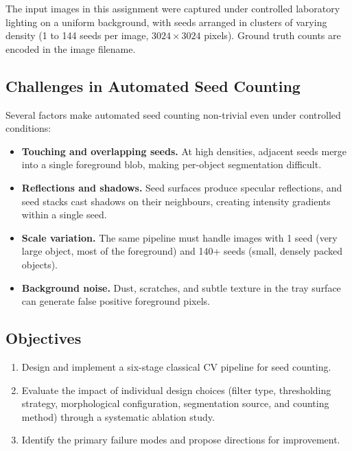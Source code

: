 \documentclass[12pt,a4paper]{article}
\begin{document}
The input images in this assignment were captured under controlled laboratory
lighting on a uniform background, with seeds arranged in clusters of varying
density (1 to 144 seeds per image, $3024 \times 3024$ pixels). Ground truth
counts are encoded in the image filename.

\subsection{Challenges in Automated Seed Counting}

Several factors make automated seed counting non-trivial even under controlled
conditions:

\begin{itemize}
    \item \textbf{Touching and overlapping seeds.} At high densities, adjacent
          seeds merge into a single foreground blob, making per-object
          segmentation difficult.
    \item \textbf{Reflections and shadows.} Seed surfaces produce specular
          reflections, and seed stacks cast shadows on their neighbours,
          creating intensity gradients within a single seed.
    \item \textbf{Scale variation.} The same pipeline must handle images with
          1 seed (very large object, most of the foreground) and 140+ seeds
          (small, densely packed objects).
    \item \textbf{Background noise.} Dust, scratches, and subtle texture in the
          tray surface can generate false positive foreground pixels.
\end{itemize}

\subsection{Objectives}

\begin{enumerate}
    \item Design and implement a six-stage classical CV pipeline for seed
          counting.
    \item Evaluate the impact of individual design choices (filter type,
          thresholding strategy, morphological configuration, segmentation
          source, and counting method) through a systematic ablation study.
    \item Identify the primary failure modes and propose directions for
          improvement.
\end{enumerate}
\end{document}
